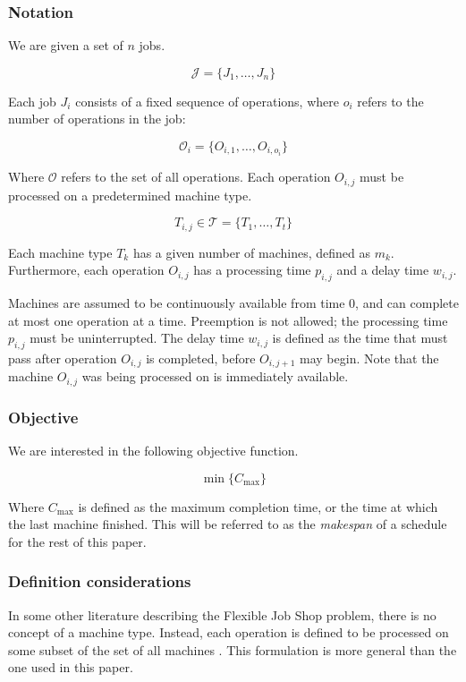 \documentclass[a4paper,12pt]{article}
\begin{document}
\subsubsection{Notation}

We are given a set of $n$ jobs.

\[ \mathcal{J} = \{J_1, \dots, J_n\} \]

Each job $J_i$ consists of a fixed sequence of operations, where $o_i$ refers to the number of operations in the job:

\[ \mathcal{O}_i = \{O_{i,1}, \dots, O_{i, o_i}\} \]

Where $\mathcal{O}$ refers to the set of all operations. Each operation $O_{i,j}$ must be processed on a predetermined machine type.

\[ T_{i,j} \in \mathcal{T} = \{T_1, \dots, T_t\} \]

Each machine type $T_k$ has a given number of machines, defined as $m_k$. Furthermore, each operation $O_{i,j}$ has a processing time $p_{i,j}$ and a delay time $w_{i,j}$.

Machines are assumed to be continuously available from time 0, and can complete at most one operation at a time. Preemption is not allowed; the processing time $p_{i,j}$ must be uninterrupted. The delay time $w_{i,j}$ is defined as the time that must pass after operation $O_{i,j}$ is completed, before $O_{i,j + 1}$ may begin. Note that the machine $O_{i,j}$ was being processed on is immediately available.

\subsubsection{Objective}

We are interested in the following objective function.

\[ \min \{ C_\text{max} \} \]

Where $C_\text{max}$ is defined as the maximum completion time, or the time at which the last machine finished. This will be referred to as the \emph{makespan} of a schedule for the rest of this paper.

\subsubsection{Definition considerations}

In some other literature describing the Flexible Job Shop problem, there is no concept of a machine type. Instead, each operation is defined to be processed on some subset of the set of all machines \cite{approxfjsp}. This formulation is more general than the one used in this paper.
\end{document}
